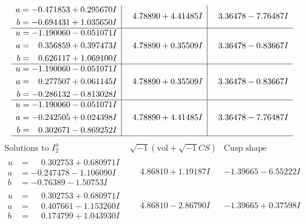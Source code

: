 \documentclass[1p]{elsarticle_modified}
\theoremstyle{definition}
\newcommand{\I}{\sqrt{-1}}
\begin{document}
$$\begin{array}{c|c|c}
\begin{aligned}
a &= -0.471853 + 0.295670 I \\
b &= -0.694431 + 1.035650 I\end{aligned}
 & \phantom{-}4.78890 + 4.41485 I & \phantom{-}3.36478 - 7.76487 I \\ \hline\begin{aligned}
u &= -1.190060 - 0.051071 I \\
a &= \phantom{-}0.356859 + 0.397473 I \\
b &= \phantom{-}0.626117 + 1.069100 I\end{aligned}
 & \phantom{-}4.78890 + 0.35509 I & \phantom{-}3.36478 - 0.83667 I \\ \hline\begin{aligned}
u &= -1.190060 - 0.051071 I \\
a &= \phantom{-}0.277507 + 0.061145 I \\
b &= -0.286132 - 0.813028 I\end{aligned}
 & \phantom{-}4.78890 + 0.35509 I & \phantom{-}3.36478 - 0.83667 I \\ \hline\begin{aligned}
u &= -1.190060 - 0.051071 I \\
a &= -0.242505 + 0.024398 I \\
b &= \phantom{-}0.302671 - 0.869252 I\end{aligned}
 & \phantom{-}4.78890 + 4.41485 I & \phantom{-}3.36478 - 7.76487 I\\
 \hline 
 \end{array}$$\newpage$$\begin{array}{c|c|c}  
\text{Solutions to }I^u_{2}& \I (\text{vol} + \sqrt{-1}CS) & \text{Cusp shape}\\
 \hline 
\begin{aligned}
u &= \phantom{-}0.302753 + 0.680971 I \\
a &= -0.247478 - 1.106090 I \\
b &= -0.76389 - 1.50753 I\end{aligned}
 & \phantom{-}4.86810 + 1.19187 I & -1.39665 - 6.55222 I \\ \hline\begin{aligned}
u &= \phantom{-}0.302753 + 0.680971 I \\
a &= \phantom{-}0.407661 - 1.153260 I \\
b &= \phantom{-}0.174799 + 1.043930 I\end{aligned}
 & \phantom{-}4.86810 - 2.86790 I & -1.39665 + 0.37598 I \\ \hline\begin{aligned}

\end{aligned}
\end{array}$$
\end{document}

